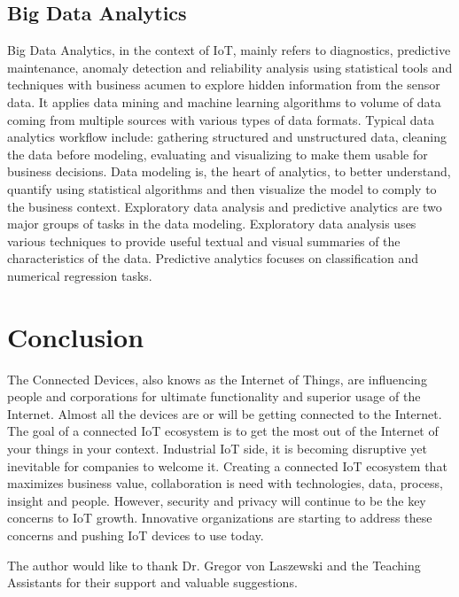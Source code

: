 \documentclass[sigconf]{acmart}
\begin{document}
	\subsection{Big Data Analytics}
	Big Data Analytics, in the context of IoT, mainly refers to diagnostics, predictive maintenance, anomaly detection and reliability analysis using statistical tools and techniques with business acumen to explore hidden information from the sensor data. It applies data mining and machine learning algorithms to volume of data coming from multiple sources with various types of data formats. Typical data analytics workflow include: gathering structured and unstructured data, cleaning the data before modeling, evaluating and visualizing to make them usable for business decisions. Data modeling is, the heart of analytics, to better understand, quantify using statistical algorithms and then visualize the model to comply to the business context. Exploratory data analysis and predictive analytics are two major groups of tasks in the data modeling. Exploratory data analysis uses various techniques to provide useful textual and visual summaries of the characteristics of the data. Predictive analytics focuses on classification and numerical regression tasks. 
	
	
	\section{Conclusion}	
	
	
	The Connected Devices, also knows as the Internet of Things, are influencing people and corporations for ultimate functionality and superior usage of the Internet. Almost all the devices are or will be getting connected to the Internet. The goal of a connected IoT ecosystem is to get the most out of the Internet of your things in your context. Industrial IoT side, it is becoming disruptive yet inevitable for companies to welcome it. Creating a connected IoT ecosystem that maximizes business value, collaboration is need with technologies, data, process, insight and people. However, security and privacy will continue to be the key concerns to IoT growth. Innovative organizations are starting to address these concerns and pushing IoT devices to use today.
	
	\begin{acks}		
	
The author would like to thank Dr. Gregor von Laszewski and the Teaching Assistants for their support and valuable suggestions.
		
	\end{acks}

	
	 
	

	
\end{document}
